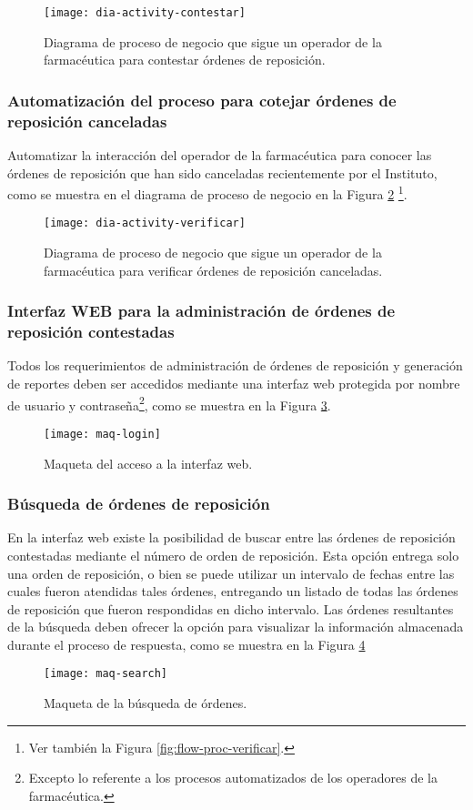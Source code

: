 \begin{figure}[h]
  \centering
  \texttt{[image: dia-activity-contestar]}
  \caption{Diagrama de proceso de negocio que sigue un operador de la farmacéutica para contestar órdenes de reposición.}
  \label{fig:dia-activity-contestar}
\end{figure}

\subsubsection{Automatización del proceso para cotejar órdenes de reposición canceladas}
Automatizar la interacción del operador de la farmacéutica para conocer las órdenes de reposición que han sido canceladas recientemente por el Instituto, como se muestra en el diagrama de proceso de negocio en la Figura \ref{fig:dia-activity-verificar} \footnote{
Ver también la Figura \ref{fig:flow-proc-verificar}.}.
\begin{figure}[h]
  \centering
  \texttt{[image: dia-activity-verificar]}
  \caption{Diagrama de proceso de negocio que sigue un operador de la farmacéutica para verificar órdenes de reposición canceladas.}
  \label{fig:dia-activity-verificar}
\end{figure}

\subsubsection{Interfaz WEB para la administración de órdenes de reposición contestadas}
Todos los requerimientos de administración de órdenes de reposición y generación de reportes deben ser accedidos mediante una interfaz web protegida por nombre de usuario y contraseña\footnote{Excepto lo referente a los procesos automatizados de los operadores de la farmacéutica.}, como se muestra en la Figura \ref{fig:maq-login}.
\begin{figure}[h]
  \centering
  \texttt{[image: maq-login]} 
  \caption{Maqueta del acceso a la interfaz web.}
  \label{fig:maq-login}
\end{figure} 

\subsubsection{Búsqueda de órdenes de reposición}
En la interfaz web existe la posibilidad de buscar entre las órdenes de reposición contestadas mediante el número de orden de reposición. Esta opción entrega solo una orden de reposición, o bien se puede utilizar un intervalo de fechas entre las cuales fueron atendidas tales órdenes, entregando un listado de todas las órdenes de reposición que fueron respondidas en dicho intervalo. Las órdenes resultantes de la búsqueda deben ofrecer la opción para visualizar la información almacenada durante el proceso de respuesta, como se muestra en la Figura \ref{fig:maq-search}
\begin{figure}[h]
  \centering
  \texttt{[image: maq-search]} 
  \caption{Maqueta de la búsqueda de órdenes.}
  \label{fig:maq-search}
\end{figure} 

